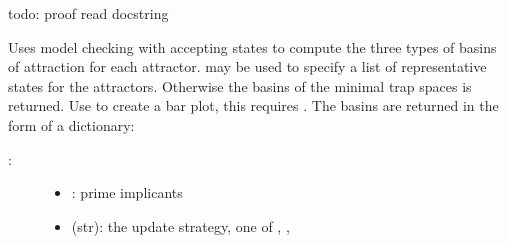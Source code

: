 \documentclass[letterpaper,10pt,english]{sphinxmanual}
\begin{document}
\begin{fulllineitems}
\label{\detokenize{Basins:PyBoolNet.Basins.all_basins}}
todo: proof read docstring

Uses model checking with accepting states to compute the three types of basins of attraction for each attractor.
 may be used to specify a list of representative states for the attractors.
Otherwise the basins of the minimal trap spaces is returned.
Use  to create a bar plot, this requires .
The basins are returned in the form of a dictionary:

\begin{sphinxVerbatim}[commandchars=\\\{\}]
     
     
              
                             
                              
     
     
\end{sphinxVerbatim}
\begin{description}
\item[{:}] \leavevmode\begin{itemize}
\item {} 
: prime implicants

\item {} 
 (str): the update strategy, one of , , 


\end{itemize}
\end{description}
\end{fulllineitems}
\end{document}

